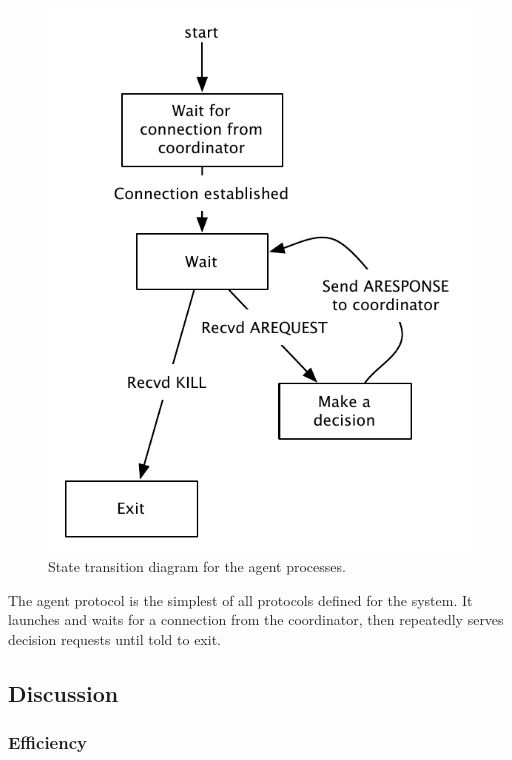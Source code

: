 \begin{figure}
    \begin{center}
        \includegraphics[scale=0.5]{figures/state_agent.pdf}
    \end{center}
    \caption{State transition diagram for the agent processes.}
    \label{agent}
\end{figure}

The agent protocol is the simplest of all protocols defined for the system. It launches and waits for a connection from the coordinator, then repeatedly serves decision requests until told to exit.

\subsection{Discussion}

\subsubsection{Efficiency}


